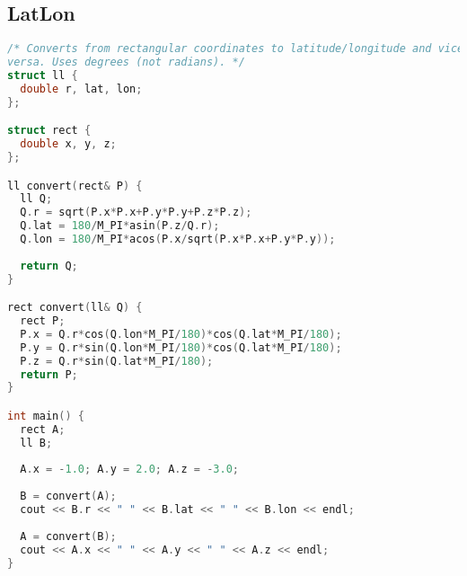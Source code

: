 \subsection{LatLon}
\begin{lstlisting}[language=C++]
/* Converts from rectangular coordinates to latitude/longitude and vice
versa. Uses degrees (not radians). */
struct ll {
  double r, lat, lon;
};

struct rect {
  double x, y, z;
};

ll convert(rect& P) {
  ll Q;
  Q.r = sqrt(P.x*P.x+P.y*P.y+P.z*P.z);
  Q.lat = 180/M_PI*asin(P.z/Q.r);
  Q.lon = 180/M_PI*acos(P.x/sqrt(P.x*P.x+P.y*P.y));
  
  return Q;
}

rect convert(ll& Q) {
  rect P;
  P.x = Q.r*cos(Q.lon*M_PI/180)*cos(Q.lat*M_PI/180);
  P.y = Q.r*sin(Q.lon*M_PI/180)*cos(Q.lat*M_PI/180);
  P.z = Q.r*sin(Q.lat*M_PI/180);
  return P;
}

int main() {
  rect A;
  ll B;
  
  A.x = -1.0; A.y = 2.0; A.z = -3.0;
  
  B = convert(A);
  cout << B.r << " " << B.lat << " " << B.lon << endl;
  
  A = convert(B);
  cout << A.x << " " << A.y << " " << A.z << endl;
}
\end{lstlisting}